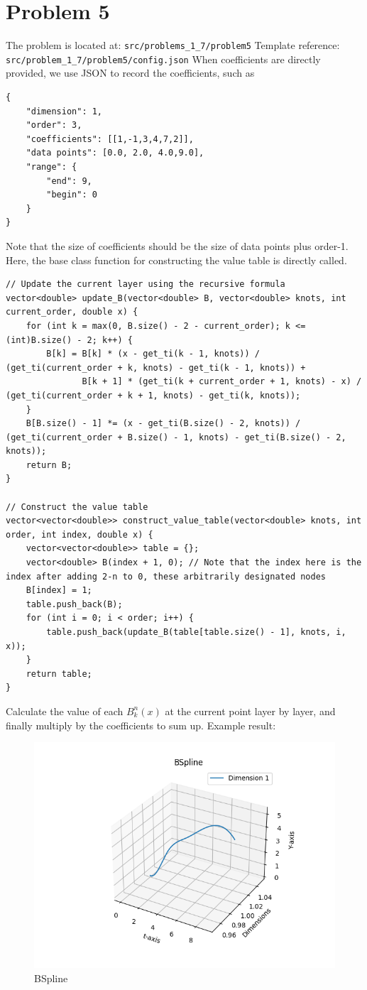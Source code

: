 \documentclass[a4paper]{article}
\begin{document}
\section*{Problem 5}
The problem is located at: \texttt{src/problems\_1\_7/problem5}
Template reference: \texttt{src/problem\_1\_7/problem5/config.json}
When coefficients are directly provided, we use JSON to record the coefficients, such as
\begin{verbatim}
{
    "dimension": 1,
    "order": 3,
    "coefficients": [[1,-1,3,4,7,2]],
    "data points": [0.0, 2.0, 4.0,9.0],
    "range": {
        "end": 9,
        "begin": 0
    }
}
\end{verbatim}
Note that the size of coefficients should be the size of data points plus order-1.
Here, the base class function for constructing the value table is directly called.
\begin{verbatim}
// Update the current layer using the recursive formula
vector<double> update_B(vector<double> B, vector<double> knots, int current_order, double x) {
    for (int k = max(0, B.size() - 2 - current_order); k <= (int)B.size() - 2; k++) {
        B[k] = B[k] * (x - get_ti(k - 1, knots)) / (get_ti(current_order + k, knots) - get_ti(k - 1, knots)) +
               B[k + 1] * (get_ti(k + current_order + 1, knots) - x) / (get_ti(current_order + k + 1, knots) - get_ti(k, knots));
    }
    B[B.size() - 1] *= (x - get_ti(B.size() - 2, knots)) / (get_ti(current_order + B.size() - 1, knots) - get_ti(B.size() - 2, knots));
    return B;
}

// Construct the value table
vector<vector<double>> construct_value_table(vector<double> knots, int order, int index, double x) {
    vector<vector<double>> table = {};
    vector<double> B(index + 1, 0); // Note that the index here is the index after adding 2-n to 0, these arbitrarily designated nodes
    B[index] = 1;
    table.push_back(B);
    for (int i = 0; i < order; i++) {
        table.push_back(update_B(table[table.size() - 1], knots, i, x));
    }
    return table;
}
\end{verbatim}
Calculate the value of each $B^n_k(x)$ at the current point layer by layer, and finally multiply by the coefficients to sum up.
Example result:
\begin{figure}[H] 
    \centering
    \includegraphics{../figure/BSpline.png} 
    \caption{BSpline} 
\end{figure}
\end{document}
